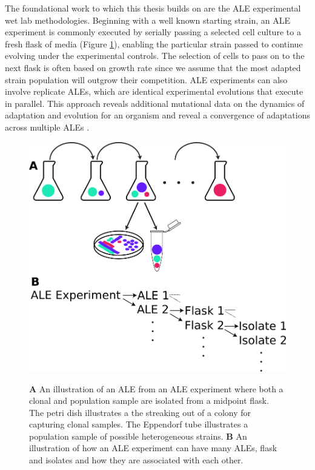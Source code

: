 \documentclass[12pt,final,masters,chapterheads]{ucsd}  %
\begin{document}
%
%

%
%

The foundational work to which this thesis builds on are the ALE experimental wet lab methodologies. Beginning with a well known starting strain, an ALE experiment is commonly executed by serially passing a selected cell culture to a fresh flask of media (Figure \ref{fig:ale_experiment_samples}), enabling the particular strain passed to continue evolving under the experimental controls. The selection of cells to pass on to the next flask is often based on growth rate since we assume that the most adapted strain population will outgrow their competition. ALE experiments can also involve replicate ALEs, which are identical experimental evolutions that execute in parallel. This approach reveals additional mutational data on the dynamics of adaptation and evolution for an organism and reveal a convergence of adaptations across multiple ALEs \cite{sys_bio_book}.
\begin{figure}[h!]
  \caption{\textbf{A} An illustration of an ALE from an ALE experiment where both a clonal and population sample are isolated from a midpoint flask. The petri dish illustrates a the streaking out of a colony for capturing clonal samples. The Eppendorf tube illustrates a population sample of possible heterogeneous strains. \textbf{B} An illustration of how an ALE experiment can have many ALEs, flask and isolates and how they are associated with each other.}
  \centering
  \includegraphics[width=1\textwidth]{ale_experiment_samples.png}
  \label{fig:ale_experiment_samples}
\end{figure}
\end{document}
